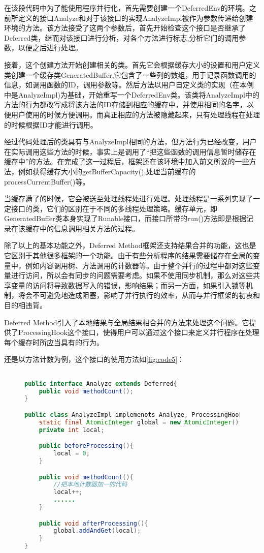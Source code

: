 在该段代码中为了能使用程序并行化，首先需要创建一个DeferredEnv的环境。之前所定义的接口Analyze和对于该接口的实现AnalyzeImpl被作为参数传递给创建环境的方法。该方法接受了这两个参数后，首先开始检查这个接口是否继承了Deferred类，继而对该接口进行分析，对各个方法进行标志,分析它们的调用参数，以便之后进行处理。

接着，这个创建方法开始创建相关的类。首先它会根据缓存大小的设置和用户定义类创建一个缓存类GeneratedBuffer,它包含了一些列的数组，用于记录函数调用的信息，如调用函数的ID，调用参数等。然后方法以用户自定义类的实现（在本例中是AnalyzeImpl)为基础，开始重写一个DeferredEnv类。该类将AnalyzeImpl中的方法的行为都改写成将该方法的ID存储到相应的缓存中，并使用相同的名字，以便用户使用的时候方便调用。而真正相应的方法被隐藏起来，只有处理线程在处理的时候根据ID才能进行调用。

经过代码处理后的类具有与AnalyzeImpl相同的方法，但方法行为已经改变，用户在实际调用这些方法的时候，事实上是调用了“把这些函数的调用信息暂时储存在缓存中”的方法。在完成了这一过程后，框架还在该环境中加入前文所说的一些方法，例如获得缓存大小的getBufferCapacity(),处理当前缓存的processCurrentBuffer()等。

当缓存满了的时候，它会被送至处理线程处进行处理。处理线程是一系列实现了一定接口的类，它们的区别在于不同的多线程处理策略。缓存单元，即GeneratedBuffer类本身实现了Runable接口，而接口所带的run()方法即是根据记录在该缓存中的信息调用相关方法的过程。

除了以上的基本功能之外，Deferred Method框架还支持结果合并的功能，这也是它区别于其他很多框架的一个功能。由于有些分析程序的结果需要储存在全局的变量中，例如内容调用树、方法调用的计数器等。由于整个并行的过程中都对这些变量进行访问，所以会有同步的问题需要考虑。如果不使用同步机制，那么对这些共享变量的访问将导致数据写入的错误，影响结果；而另一方面，如果引入锁等机制，将会不可避免地造成阻塞，影响了并行执行的效率，从而与并行框架的初衷和目的相违背。

Deferred Method引入了本地结果与全局结果相合并的方法来处理这个问题。它提供了ProcessingHook这个接口，使得用户可以通过这个接口来定义并行程序在处理每个缓存时所应当具有的行为。

还是以方法计数为例，这个接口的使用方法如\ref{fig:code5}：

\begin{figure}[!htp]
\begin{lstlisting}[language=Java]

public interface Analyze extends Deferred{
	public void methodCount();
}

public class AnalyzeImpl implemenots Analyze, ProcessingHooks{
	static final AtomicInteger global = new AtomicInteger();
	private int local;

	public beforeProcessing(){
		local = 0;
	}

	public void methodCount(){
		//把本地计数器加一的代码
		local++;
		......
	}

	public void afterProcessing(){
		global.addAndGet(local);
	}
}
\end{lstlisting}
\end{figure}

